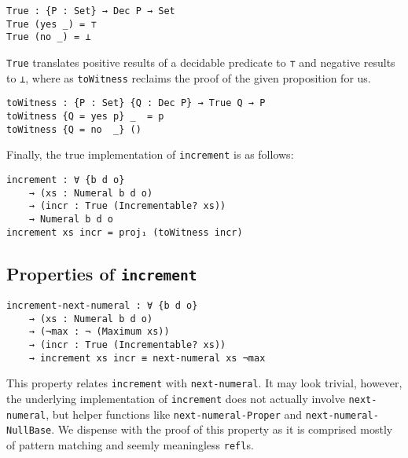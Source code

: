 \documentclass[\main/thesis.tex]{subfiles}
\begin{document}
\begin{lstlisting}
True : {P : Set} → Dec P → Set
True (yes _) = ⊤
True (no _) = ⊥
\end{lstlisting}

\lstinline|True| translates positive results of a decidable predicate to
\lstinline|⊤| and negative results to \lstinline|⊥|,
where as \lstinline|toWitness| reclaims the proof of the given proposition for us.

\begin{lstlisting}
toWitness : {P : Set} {Q : Dec P} → True Q → P
toWitness {Q = yes p} _  = p
toWitness {Q = no  _} ()
\end{lstlisting}

Finally, the true implementation of \lstinline|increment| is as follows:

\begin{lstlisting}
increment : ∀ {b d o}
    → (xs : Numeral b d o)
    → (incr : True (Incrementable? xs))
    → Numeral b d o
increment xs incr = proj₁ (toWitness incr)
\end{lstlisting}

\subsection{Properties of \lstinline|increment|}

\begin{lstlisting}
increment-next-numeral : ∀ {b d o}
    → (xs : Numeral b d o)
    → (¬max : ¬ (Maximum xs))
    → (incr : True (Incrementable? xs))
    → increment xs incr ≡ next-numeral xs ¬max
\end{lstlisting}

This property relates \lstinline|increment| with \lstinline|next-numeral|.
It may look trivial, however, the underlying implementation of \lstinline|increment|
does not actually involve \lstinline|next-numeral|, but helper functions like
\lstinline|next-numeral-Proper| and \lstinline|next-numeral-NullBase|.
We dispense with the proof of this property as it is comprised mostly of pattern
matching and seemly meaningless \lstinline|refl|s.
\end{document}
